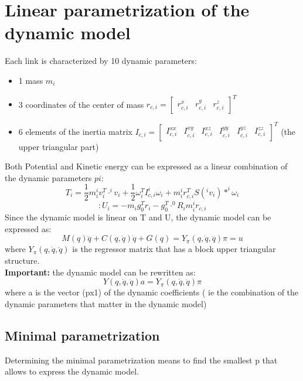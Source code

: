 \documentclass[a4paper,12pt]{article}
\begin{document}
\section{Linear parametrization of the dynamic model}
Each link is characterized by 10 dynamic parameters:
\begin{itemize}
    \item 1 mass $m_i$
    \item 3 coordinates of the center of mass $r_{c,i} = \begin{bmatrix}
        r_{c,i}^x & r_{c,i}^y & r_{c,i}^z
    \end{bmatrix} ^T$
    \item 6 elements of the inertia matrix $I_{c,i} = \begin{bmatrix}
        I_{c,i}^{xx} & I_{c,i}^{xy} & I_{c,i}^{xz} & I_{c,i}^{yy} & I_{c,i}^{yz} & I_{c,i}^{zz}
    \end{bmatrix} ^T$ (the upper triangular part)
\end{itemize}
Both Potential and Kinetic energy can be expressed 
as a linear combination of the dynamic parameters $pi$:
\begin{equation}
    T_i= \frac{1}{2}m_i ^iv_i^T \cdot ^i v_i + \frac{1}{2} \omega_i^T I_{c,i} ^i\omega_i + m_i ^ir_{c,i}^T S(^iv_i)*^i\omega_i
\end{equation}
\begin{equation}:
    U_i = -m_i g_0^T r_{i}-g_0^T \cdot ^0R_i m_i ^ir_{c,i}
\end{equation}
Since the dynamic model is linear on T and U,
the dynamic model can be expressed as:
\begin{equation}
    M(q) \ddot{q} + C(q, \dot{q}) \dot{q} + G(q) = Y_{\pi}(q,\dot{q},\ddot{q}) \pi=u
\end{equation}
where $Y_{\pi}(q,\dot{q},\ddot{q})$ is the regressor matrix that has a block
upper triangular structure.\\
\textbf{Important:} the dynamic model can be rewritten as:
\begin{equation}
    Y(q,\dot{q},\ddot{q}) a = Y_{\pi}(q,\dot{q},\ddot{q}) \pi
\end{equation}
where a is the vector (px1) of the dynamic coefficients ( ie the 
combination of the dynamic parameters that matter in the dynamic model)
\subsection{Minimal parametrization}
Determining the minimal parametrization means to find the
smallest p that allows to express the dynamic model.\\
\end{document}
